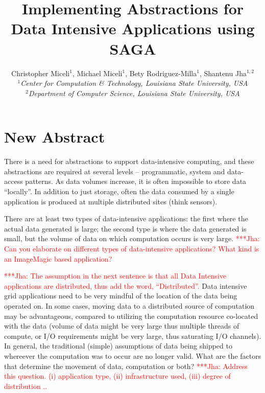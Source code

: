 \documentclass[a4paper,11pt]{article} \usepackage[utf8]{inputenc}
\newcommand{\jhanote}[1]{ {\textcolor{red} { ***Jha: #1 }}}
\newcommand{\yyenote}[1]{ {\textcolor{blue} { ***yye00: #1 }}} \else
\newcommand{\jhanote}[1]{} \newcommand{\yyenote}[1]{}
\begin{document}
\title{\large Implementing Abstractions for Data Intensive Applications
using SAGA}

\author{Christopher Miceli$^{1}$, Michael Miceli$^{1}$, Bety
Rodriguez-Milla$^{1}$, Shantenu Jha$^{1,2}$\\ \small{\emph{$^{1}$Center
for Computation \& Technology, Louisiana State University, USA}}\\
\small{\emph{$^{2}$Department of Computer Science, Louisiana State
University, USA}}}

\maketitle

\section{New Abstract}

There is a need for abstractions to support data-intensive computing,
and these abstractions are required at several levels -- programmatic,
system and data-access patterns.  As data volumes increase, it is often
impossible to store data ``locally''. In addition to just storage, often
the data consumed by a single application is produced at multiple
distributed sites (think sensors).

There are at least two types of data-intensive applications: the first
where the actual data generated is large; the second type is where the
data generated is small, but the volume of data on which computation
occurs is very large. \jhanote{Can you elaborate on different types of
data-intensive applications? What kind is an ImageMagic based
application?}

\jhanote{The assumption in the next sentence is that all Data Intensive
applications are distributed, thus add the word, ``Distributed''.} Data
intensive grid applications need to be very mindful of the location of
the data being operated on.  In some cases, moving data to a distributed
source of computation may be advantageous, compared to utilizing the
computation resource co-located with the data (volume of data might be
very large thus multiple threads of compute, or I/O requirements might
be very large, thus saturating I/O channels). In general, the
traditional (simple) assumptions of data being shipped to whereever the
computation was to occur are no longer valid. What are the factors that
determine the movement of data, computation or both?  \jhanote{Address
this question. (i) application type, (ii) infrastructure used, (iii)
degree of distribution .. }
\end{document}
